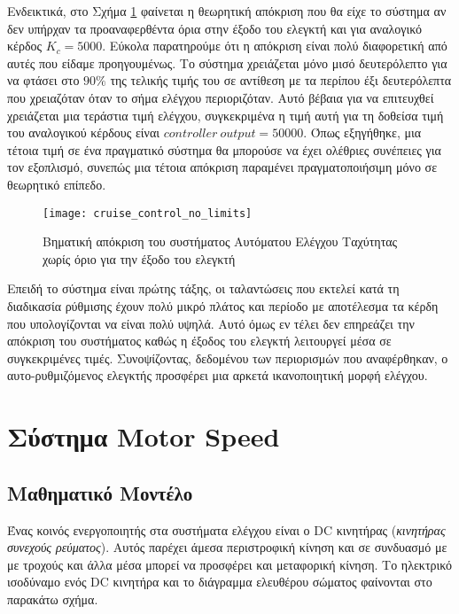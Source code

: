 Ενδεικτικά, στο Σχήμα \ref{fig:cruise_control_no_limits} φαίνεται η θεωρητική απόκριση που θα είχε το σύστημα αν δεν υπήρχαν τα προαναφερθέντα όρια στην έξοδο του ελεγκτή και για αναλογικό κέρδος $K_c = 5000$. Εύκολα παρατηρούμε ότι η απόκριση είναι πολύ διαφορετική από αυτές που είδαμε προηγουμένως. Το σύστημα χρειάζεται μόνο μισό δευτερόλεπτο για να φτάσει στο $90\%$ της τελικής τιμής του σε αντίθεση με τα περίπου έξι δευτερόλεπτα που χρειαζόταν όταν το σήμα ελέγχου περιοριζόταν. Αυτό βέβαια για να επιτευχθεί χρειάζεται μια τεράστια τιμή ελέγχου, συγκεκριμένα η τιμή αυτή για τη δοθείσα τιμή του αναλογικού κέρδους είναι $controller\ output = 50000$. Όπως εξηγήθηκε, μια τέτοια τιμή σε ένα πραγματικό σύστημα θα μπορούσε να έχει ολέθριες συνέπειες για τον εξοπλισμό, συνεπώς μια τέτοια απόκριση παραμένει πραγματοποιήσιμη μόνο σε θεωρητικό επίπεδο.

\begin{figure}[h]
  \centering
  \texttt{[image: cruise\_control\_no\_limits]}
  \caption{Βηματική απόκριση του συστήματος Αυτόματου Ελέγχου Ταχύτητας χωρίς όριο για την έξοδο του ελεγκτή}
  \label{fig:cruise_control_no_limits}
\end{figure}

Επειδή το σύστημα είναι πρώτης τάξης, οι ταλαντώσεις που εκτελεί κατά τη διαδικασία ρύθμισης έχουν πολύ μικρό πλάτος και περίοδο με αποτέλεσμα τα κέρδη που υπολογίζονται να είναι πολύ υψηλά. Αυτό όμως εν τέλει δεν επηρεάζει την απόκριση του συστήματος καθώς η έξοδος του ελεγκτή λειτουργεί μέσα σε συγκεκριμένες τιμές. Συνοψίζοντας, δεδομένου των περιορισμών που αναφέρθηκαν, ο αυτο-ρυθμιζόμενος ελεγκτής προσφέρει μια αρκετά ικανοποιητική μορφή ελέγχου.

\section{Σύστημα Motor Speed}

\subsection{Μαθηματικό Μοντέλο}

Ένας κοινός ενεργοποιητής στα συστήματα ελέγχου είναι ο DC κινητήρας (\emph{κινητήρας συνεχούς ρεύματος}). Αυτός παρέχει άμεσα περιστροφική κίνηση και σε συνδυασμό με με τροχούς και άλλα μέσα μπορεί να προσφέρει και μεταφορική κίνηση. Το ηλεκτρικό ισοδύναμο ενός  DC κινητήρα και το διάγραμμα ελευθέρου σώματος φαίνονται στο παρακάτω σχήμα. 

